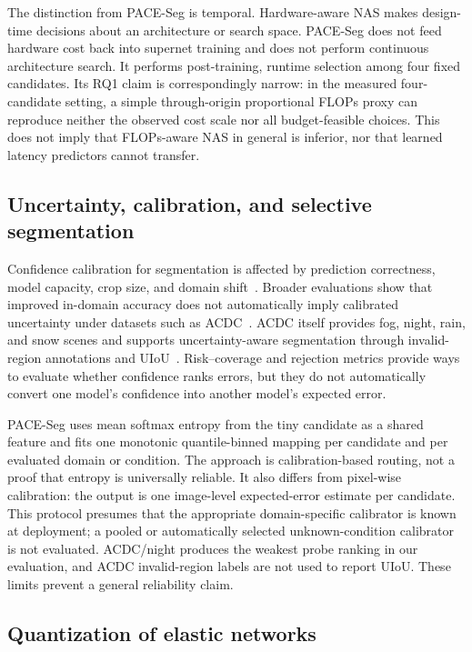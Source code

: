 \documentclass[a4paper,review,12pt]{elsarticle}
\newcommand{\method}{PACE-Seg}
\begin{document}
The distinction from \method{} is temporal. Hardware-aware NAS makes design-time decisions about an architecture or search space. \method{} does not feed hardware cost back into supernet training and does not perform continuous architecture search. It performs post-training, runtime selection among four fixed candidates. Its RQ1 claim is correspondingly narrow: in the measured four-candidate setting, a simple through-origin proportional FLOPs proxy can reproduce neither the observed cost scale nor all budget-feasible choices. This does not imply that FLOPs-aware NAS in general is inferior, nor that learned latency predictors cannot transfer.

\subsection{Uncertainty, calibration, and selective segmentation}

Confidence calibration for segmentation is affected by prediction correctness, model capacity, crop size, and domain shift~\cite{wang2023calibrating}. Broader evaluations show that improved in-domain accuracy does not automatically imply calibrated uncertainty under datasets such as ACDC~\cite{dejorge2023reliability}. ACDC itself provides fog, night, rain, and snow scenes and supports uncertainty-aware segmentation through invalid-region annotations and UIoU~\cite{sakaridis2021acdc}. Risk--coverage and rejection metrics provide ways to evaluate whether confidence ranks errors, but they do not automatically convert one model's confidence into another model's expected error.

\method{} uses mean softmax entropy from the tiny candidate as a shared feature and fits one monotonic quantile-binned mapping per candidate and per evaluated domain or condition. The approach is calibration-based routing, not a proof that entropy is universally reliable. It also differs from pixel-wise calibration: the output is one image-level expected-error estimate per candidate. This protocol presumes that the appropriate domain-specific calibrator is known at deployment; a pooled or automatically selected unknown-condition calibrator is not evaluated. ACDC/night produces the weakest probe ranking in our evaluation, and ACDC invalid-region labels are not used to report UIoU. These limits prevent a general reliability claim.

\subsection{Quantization of elastic networks}
\end{document}
